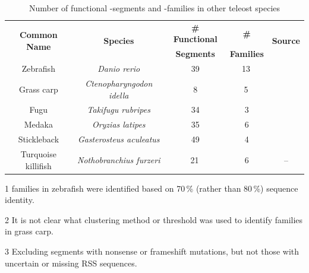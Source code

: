 \begin{table}[hb]
	\centering
	\begin{threeparttable}
	\centering
	\caption{Number of functional \vh-segments and \vh-families in other teleost species}
	\label{tab:teleost-vh-counts}
	\begin{tabular}{ccccc}\toprule
	\multirow{2}{*}{	\textbf{Common Name}} & \multirow{2}{*}{\textbf{Species}} & \textbf{\# Functional} & \textbf{	\# \vh} & \multirow{2}{*}{\textbf{Source}} \\
	& & \textbf{\vh Segments} & \textbf{Families} & \\\midrule
	Zebrafish & \textit{Danio rerio} & 39 & 13\,\tnote{1} & \parencite{magadan2015fishrepertoires} \\
	Grass carp & \textit{Ctenopharyngodon idella} & 8 & 5\,\tnote{2} & \parencite{xiao2010grasscarp} \\
	Fugu & \textit{Takifugu rubripes} & 34 & 3 & \parencite{magadan2015fishrepertoires} \\
	Medaka & \textit{Oryzias latipes} & 35 & 6 & \parencite{fillatreau2013astonishing,magadan2011medaka} \\
	Stickleback & \textit{Gasterosteus aculeatus} & 49 & 4 & \parencite{magadan2015fishrepertoires} \\
	Turquoise killifish & \textit{Nothobranchius furzeri} & 21\,\tnote{3} & 6 & -- \\
	\bottomrule\end{tabular}
	\begin{tablenotes}
	\item[1] \vh families in zebrafish were identified based on 70\,\% (rather than 80\,\%) sequence identity.
	\item[2] It is not clear what clustering method or threshold was used to identify \vh families in grass carp.
	\item[3] Excluding \vh segments with nonsense or frameshift mutations, but not those with uncertain or missing RSS sequences.
	\end{tablenotes}
	\end{threeparttable}
\end{table}
	
